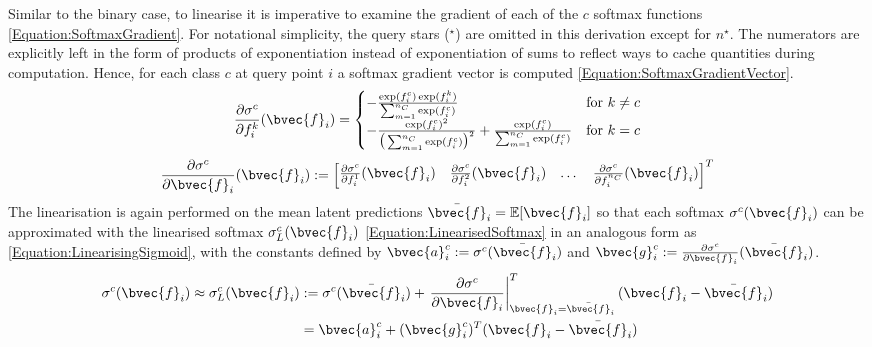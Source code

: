 				Similar to the binary case, to linearise it is imperative to examine the gradient of each of the $c$ softmax functions \eqref{Equation:SoftmaxGradient}. For notational simplicity, the query stars ($^{\star}$) are omitted in this derivation except for $n^{\star}$. The numerators are explicitly left in the form of products of exponentiation instead of exponentiation of sums to reflect ways to cache quantities during computation. Hence, for each class $c$ at query point $i$ a softmax gradient vector is computed \eqref{Equation:SoftmaxGradientVector}. \begin{equation}
					\frac{\partial \sigma^{c}}{\partial f^{k}_{i}}(\bvec{f}_{i}) =
					\begin{cases} 
						- \frac{\exp(f^{c}_{i}) \exp(f^{k}_{i})}{\sum_{m = 1}^{n_{C}} \exp({f^{c}_{i}})} & \text{for } k \neq c  \\
						- \frac{\exp(f^{c}_{i})^{2}}{\big(\sum_{m = 1}^{n_{C}} \exp({f^{c}_{i}})\big)^{2}} + \frac{\exp(f^{c}_{i})}{\sum_{m = 1}^{n_{C}} \exp({f^{c}_{i}})}& \text{for } k = c
					\end{cases}
				\label{Equation:SoftmaxGradient}
				\end{equation} \begin{equation}
					\frac{\partial \sigma^{c}}{\partial \bvec{f}_{i}}(\bvec{f}_{i}) := \begin{bmatrix} \frac{\partial \sigma^{c}}{\partial f^{1}_{i}}(\bvec{f}_{i}) & \frac{\partial \sigma^{c}}{\partial f^{2}_{i}}(\bvec{f}_{i}) & \dots & \frac{\partial \sigma^{c}}{\partial f^{n_{C}}_{i}}(\bvec{f}_{i}) \end{bmatrix}^{T}
				\label{Equation:SoftmaxGradientVector}
				\end{equation} The linearisation is again performed on the mean latent predictions $\bar{\bvec{f}}_{i} = \mathbb{E}[\bvec{f}_{i}]$ so that each softmax $\sigma^{c}(\bvec{f}_{i})$ can be approximated with the linearised softmax $\sigma^{c}_{L}(\bvec{f}_{i})$ \eqref{Equation:LinearisedSoftmax} in an analogous form as \eqref{Equation:LinearisingSigmoid}, with the constants defined by $\bvec{a}^{c}_{i} := \sigma^{c}(\bar{\bvec{f}}_{i})$ and $\bvec{g}^{c}_{i} := \frac{\partial \sigma^{c}}{\partial \bvec{f}_{i}}(\bar{\bvec{f}}_{i})$. \begin{equation}
					\begin{aligned}
						\sigma^{c}(\bvec{f}_{i}) \approx \sigma^{c}_{L}(\bvec{f}_{i}) & := \sigma^{c}(\bar{\bvec{f}}_{i}) + \left. \frac{\partial \sigma^{c}}{\partial \bvec{f}_{i}} \right|^{T}_{\bvec{f}_{i} = \bar{\bvec{f}}_{i}} (\bvec{f}_{i} - \bar{\bvec{f}}_{i}) \\
						& = \bvec{a}^{c}_{i} + (\bvec{g}^{c}_{i})^{T} (\bvec{f}_{i} - \bar{\bvec{f}}_{i})
					\end{aligned}
				\label{Equation:LinearisedSoftmax}
				\end{equation} 
				
